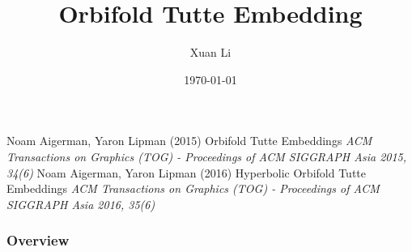 \documentclass{beamer}
\title[Short title]{Orbifold Tutte Embedding } %
\author{Xuan Li} %
\institute[CS@SBU] %
{
Stony Brook University \\ %
\medskip
\textit{xuanli2@cs.stonybrook.edu} %
}
\date{\today} %
\begin{document}
\begin{frame}
\titlepage %
\end{frame}
\begin{frame}
\footnotesize{
\begin{thebibliography}{99} %
 Noam Aigerman, Yaron Lipman  (2015)
\newblock Orbifold Tutte Embeddings
\newblock \emph{ACM Transactions on Graphics (TOG) - Proceedings of ACM SIGGRAPH Asia 2015, 34(6)}
Noam Aigerman, Yaron Lipman (2016)
\newblock Hyperbolic Orbifold Tutte Embeddings
\newblock \emph{ACM Transactions on Graphics (TOG) - Proceedings of ACM SIGGRAPH Asia 2016, 35(6)}
\end{thebibliography}
}
\end{frame}

\begin{frame}
\frametitle{Overview} %
\tableofcontents %
\end{frame}


\end{document}
